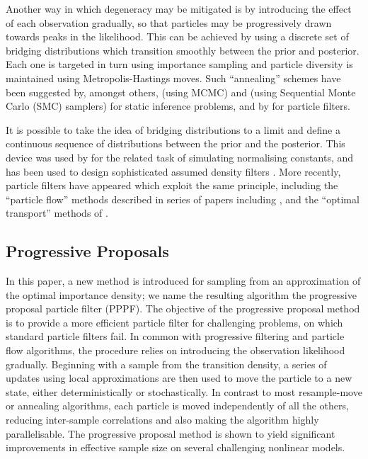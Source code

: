 \documentclass{article}
\begin{document}
Another way in which degeneracy may be mitigated is by introducing the effect of each observation gradually, so that particles may be progressively drawn towards peaks in the likelihood. This can be achieved by using a discrete set of bridging distributions which transition smoothly between the prior and posterior. Each one is targeted in turn using importance sampling and particle diversity is maintained using Metropolis-Hastings moves. Such ``annealing'' schemes have been suggested by, amongst others, \citet{Neal2001} (using MCMC) and \citet{DelMoral2006} (using Sequential Monte Carlo (SMC) samplers) for static inference problems, and by \citet{Godsill2001b,Gall2007,Deutscher2000,Oudjane2000} for particle filters.

It is possible to take the idea of bridging distributions to a limit and define a continuous sequence of distributions between the prior and the posterior. This device was used by \citet{Gelman1998} for the related task of simulating normalising constants, and has been used to design sophisticated assumed density filters \citep{Hanebeck2003a,Hanebeck2012,Hagmar2011}. More recently, particle filters have appeared which exploit the same principle, including the ``particle flow'' methods described in series of papers including \citep{Daum2008,Daum2011d}, and the ``optimal transport'' methods of \cite{Reich2011,Reich2012a}.

\subsection{Progressive Proposals}

In this paper, a new method is introduced for sampling from an approximation of the optimal importance density; we name the resulting algorithm the progressive proposal particle filter (PPPF). The objective of the progressive proposal method is to provide a more efficient particle filter for challenging problems, on which standard particle filters fail. In common with progressive filtering and particle flow algorithms, the procedure relies on introducing the observation likelihood gradually. Beginning with a sample from the transition density, a series of updates using local approximations are then used to move the particle to a new state, either deterministically or stochastically. In contrast to most resample-move or annealing algorithms, each particle is moved independently of all the others, reducing inter-sample correlations and also making the algorithm highly parallelisable. The progressive proposal method is shown to yield significant improvements in effective sample size on several challenging nonlinear models.
\end{document}
